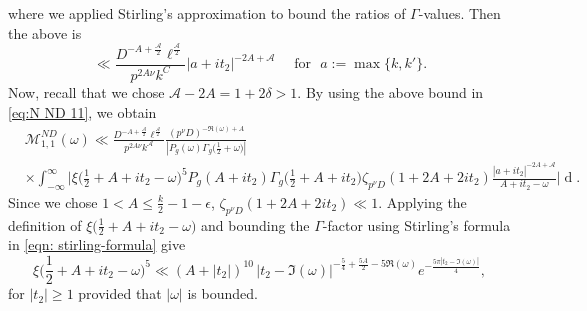 \documentclass[12pt]{amsart}
\theoremstyle{plain}
\theoremstyle{definition}
\begin{document}
where we applied Stirling's approximation to  bound the ratios of $\Gamma$-values. Then the above is
    \[
    \ll  \frac{D^{-A+\frac{\mathcal{A}}{2}} \ell^{\frac{\mathcal{A}}{2}}  }{p^{2A\nu} k^C}  |a+it_2|^{-2A+\mathcal{A}} 
    \quad \,\, \text{for } \,\, a:= \max\{k, k'\}.
    \]
Now, recall that we chose $\mathcal{A}-2A= 1+2\delta>1$. By using the above bound in \eqref{eq:N ND 11}, we obtain
    \begin{align*}
   &\mathcal{M}_{1,1}^{ND}(\omega)
    \ll    \frac{D^{-A+\frac{\mathcal{A}}{2}} \ell^{\frac{\mathcal{A}}{2}}  }{p^{2A\nu} k^{\mathcal{A}}}  
    \frac{(p^\nu D)^{-\Re(\omega)+A}}{\left|P_g(\omega)\Gamma_g\big(\frac12+\omega\big)\right|}
    \\
      & \times \int_{-\infty}^\infty 
     \bigg|
     \xi\Big(\frac12+A+it_2-\omega\Big)^5 
    P_g(A+it_2) \Gamma_g\Big(\tfrac12+A+it_2\Big) 
    \zeta_{p^\nu D}(1+2A+2it_2)
    \frac{ |a+it_2|^{-2A+\mathcal{A}} }{A+it_2-\omega} \bigg|
    \mathop{dt_2}.
    \end{align*}
Since we chose $1< A \leq \frac{k}{2}-1-\epsilon$, $\zeta_{p^\nu D} (1+2A+2it_2) \ll 1$. Applying the definition of $ \xi\big(\frac12+A+it_2-\omega\big)$ and bounding the $\Gamma$-factor using Stirling's formula in \eqref{eqn: stirling-formula} give
      \[
     \xi\Big(\frac12+A+it_2-\omega\Big)^5 
     \ll (A+|t_2|)^{10} \, |t_2-\Im(\omega)|^{-\frac54+\frac{5A}{2}-5\Re(\omega)} e^{-\frac{5\pi |t_2-\Im(\omega)|}{4}},
        \]
      for   $|t_2| \geq 1$ provided that $|\omega|$ is bounded.
      
\end{document}
